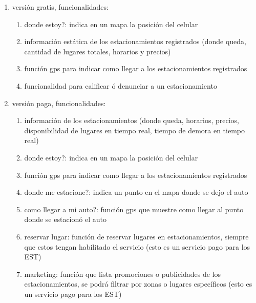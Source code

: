 \documentclass[spanish, DIV=calc, paper=a4, fontsize=11pt, twocolumn]{scrartcl}	 %
\begin{document}
\begin{enumerate}

	\item versión gratis, funcionalidades:
		
		\begin{enumerate}
			
			\item donde estoy?: indica en un mapa la posición del celular

			\item información estática de los estacionamientos registrados (donde queda, cantidad de lugares totales, horarios y precios)

			\item función gps para indicar como llegar a los estacionamientos registrados

			\item funcionalidad para calificar ó denunciar a un estacionamiento

		\end{enumerate}

	\item versión paga, funcionalidades:

		\begin{enumerate}
			
			\item información de los estacionamientos (donde queda, horarios, precios, disponibilidad de lugares en tiempo real, tiempo de demora en tiempo real)

			\item donde estoy?: indica en un mapa la posición del celular

			\item función gps para indicar como llegar a los estacionamientos registrados

			\item donde me estacione?: indica un punto en el mapa donde se dejo el auto

			\item como llegar a mi auto?: función gps que muestre como llegar al punto donde se estacionó el auto
					
			\item reservar lugar: función de reservar lugares en estacionamientos, siempre que estos tengan habilitado el servicio (esto es un servicio pago para los EST)

			\item marketing: función que lista promociones o publicidades de los estacionamientos, se podrá filtrar por zonas o lugares específicos (esto es un servicio pago para los EST)


\end{enumerate}
\end{enumerate}
\end{document}
